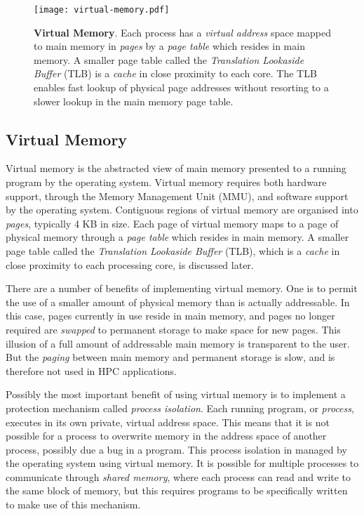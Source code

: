     
\begin{figure}
	\centering	
	\texttt{[image: virtual-memory.pdf]}
	\caption{\textbf{Virtual Memory}. Each process has a \emph{virtual address} space mapped to main memory in \emph{pages} by a \emph{page table} which resides in main memory. A smaller page table called the \emph{Translation Lookaside Buffer} (TLB) is a \emph{cache} in close proximity to each core. The TLB enables fast lookup of physical page addresses without resorting to a slower lookup in the main memory page table.}
\end{figure}


\subsection{Virtual Memory}

Virtual memory is the abstracted view of main memory presented to a running program by the operating system. Virtual memory requires both hardware support, through the Memory Management Unit (MMU), and software support by the operating system. Contiguous regions of virtual memory are organised into \emph{pages}, typically 4 KB in size. Each page of virtual memory maps to a page of physical memory through a \emph{page table} which resides in main memory. A smaller page table called the \emph{Translation Lookaside Buffer} (TLB), which is a \emph{cache} in close proximity to each processing core, is discussed later.

There are a number of benefits of implementing virtual memory. One is to permit the use of a smaller amount of physical memory than is actually addressable. In this case, pages currently in use reside in main memory, and pages no longer required are \emph{swapped} to permanent storage to make space for new pages. This illusion of a full amount of addressable main memory is transparent to the user. But the \emph{paging} between main memory and permanent storage is slow, and is therefore not used in HPC applications.

Possibly the most important benefit of using virtual memory is to implement a protection mechanism called \emph{process isolation}. Each running program, or \emph{process}, executes in its own private, virtual address space. This means that it is not possible for a process to overwrite memory in the address space of another process, possibly due a bug in a program. This process isolation in managed by the operating system using virtual memory. It is possible for multiple processes to communicate through \emph{shared memory}, where each process can read and write to the same block of memory, but this requires programs to be specifically written to make use of this mechanism. 

